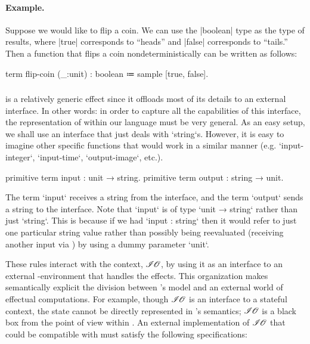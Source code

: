 \paragraph{Example.}
%
Suppose we would like to flip a coin.
We can use the \code|boolean| type as the type of results, where \code|true| corresponds to ``heads'' and \code|false| corresponds to ``tails.''
Then a function that flips a coin nondeterministically can be written as follows:
\begin{snippet}
term flip-coin (_:unit) : boolean ≔ sample [true, false].
\end{snippet}

\subsubsection{\IO}

\IO is a relatively generic effect since it offloads most of its details to an external interface.
In other words: in order to capture all the capabilities of this interface, the representation of \IO within our language must be very general.
As an easy setup, we shall use an \IO interface that just deals with \code`string`s.
However, it is easy to imagine other specific \IO functions that would work in a similar manner (e.g. \code`input-integer`, \code`input-time`, \code`output-image`, etc.).

\begin{program}[caption={Definitions for \IO}]
primitive term input  : unit   → string.
primitive term output : string → unit.
\end{program}

The term \code`input` receives a string from the \IO interface, and
the term \code`output` sends a string to the \IO interface.
Note that \code`input` is of type \code`unit → string` rather than just \code`string`.
This is because if we had \code`input : string` then it would refer to just one particular string value rather than possibly being reevaluated (receiving another input via \IO) by using a dummy parameter \code`unit`.



These rules interact with the \IO context, $\mathscr{I\hspace{-0.1em}O}$, by using it as an interface to an external \IO-environment that handles the \IO effects.
This organization makes semantically explicit the division between \LangB's model and an external world of effectual computations.
For example, though $\mathscr{I\hspace{-0.1em}O}$ is an interface to a stateful context, the state cannot be directly represented in \LangB's semantics; $\mathscr{I\hspace{-0.1em}O}$ is a black box from the point of view within \LangB.
An external implementation of $\mathscr{I\hspace{-0.1em}O}$ that could be compatible with \LangB must satisfy the following specifications:
%
